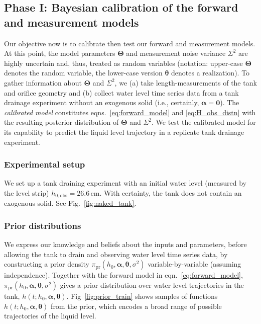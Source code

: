 \documentclass[a4paper,fleqn]{cas-dc}
\newcommand\themodel {$h(t; h_0, \boldsymbol \alpha, \boldsymbol\theta)$\xspace}
\begin{document}
\subsection{Phase I: Bayesian calibration of the forward and measurement models}
\label{sec:phaseI}
Our objective now is to calibrate then test our forward and measurement models.
At this point, the model parameters $\boldsymbol \Theta$ and measurement noise variance $\Sigma^2$ are highly uncertain and, thus, treated as random variables (notation: upper-case $\boldsymbol \Theta$ denotes the random variable, the lower-case version $\boldsymbol \theta$ denotes a realization).
To gather information about $\boldsymbol \Theta$ and $\Sigma^2$, we (a) take length-measurements of the tank and orifice geometry and (b) collect water level time series data from a tank drainage experiment without an exogenous solid (i.e., certainly, $\boldsymbol \alpha = \mathbf{0}$).
The \emph{calibrated model} constitutes eqns.~\ref{eq:forward_model} and \ref{eq:H_obs_distn} with the resulting posterior distribution of $\boldsymbol \Theta$ and $\Sigma^2$. We test the calibrated model for its capability to predict the liquid level trajectory in a replicate tank drainage experiment.


\subsubsection{Experimental setup}
We set up a tank draining experiment with an initial water level (measured by the level strip) $h_{0, \text{obs}}=26.6$\,cm. 
With certainty, the tank does not contain an exogenous solid. See Fig.~\ref{fig:naked_tank}.

\subsubsection{Prior distributions} 
We express our knowledge and beliefs about the inputs and parameters, before allowing the tank to drain and observing water level time series data, by constructing a prior density $\pi_{\text{pr}}(h_0, \boldsymbol \alpha, \boldsymbol \theta, \sigma^2)$ variable-by-variable (assuming independence). Together with the forward model in eqn.~\ref{eq:forward_model}, $\pi_{\text{pr}}(h_0, \boldsymbol \alpha, \boldsymbol \theta, \sigma^2)$ gives a prior distribution over water level trajectories in the tank, \themodel. 
Fig~\ref{fig:prior_train} shows samples of functions \themodel from the prior, which encodes a broad range of possible trajectories of the liquid level. 
\end{document}
